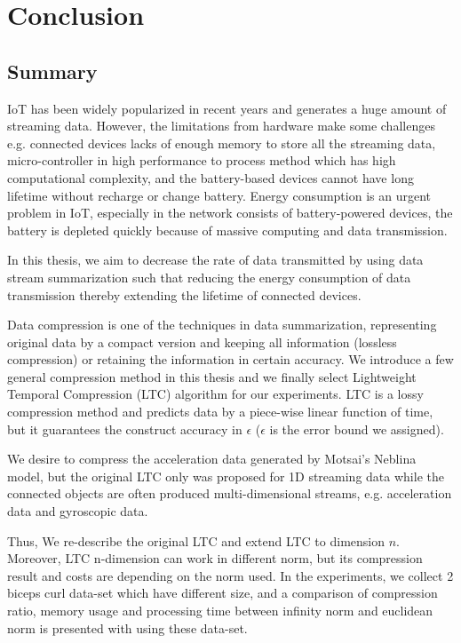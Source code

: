 \chapter{Conclusion}



\section{Summary}


IoT has been widely popularized in recent years and generates a huge amount of
streaming data. However, the limitations from hardware make some challenges e.g.
connected devices lacks of enough memory to store all the streaming data,
micro-controller in high performance to process method which has high
computational complexity, and the battery-based devices cannot have long
lifetime without recharge or change battery. Energy consumption is an urgent
problem in IoT, especially in the network consists of battery-powered devices,
the battery is depleted quickly because of massive computing and data
transmission.

In this thesis, we aim to decrease the rate of data transmitted by using data
stream summarization such that reducing the energy consumption of data
transmission thereby extending the lifetime of connected devices. 

Data compression is one of the techniques in data summarization, representing
original data by a compact version and keeping all information (lossless
compression) or retaining the information in certain accuracy. We introduce a
few general compression method in this thesis and we finally select Lightweight
Temporal Compression (LTC) algorithm for our experiments. LTC is a lossy
compression method and predicts data by a piece-wise linear function of time,
but it guarantees the construct accuracy in $\epsilon$ ($\epsilon$ is the error
bound we assigned). 

We desire to compress the acceleration data generated by Motsai's Neblina model,
but the original LTC only was proposed for 1D streaming data while the connected
objects are often produced multi-dimensional streams, e.g. acceleration data and
gyroscopic data.

Thus, We re-describe the original LTC and extend LTC to dimension $n$. Moreover,
LTC n-dimension can work in different norm, but its compression result and costs
are depending on the norm used. In the experiments, we collect 2 biceps curl
data-set which have different size, and a comparison of compression ratio,
memory usage and processing time between infinity norm and euclidean norm is
presented with using these data-set.  

